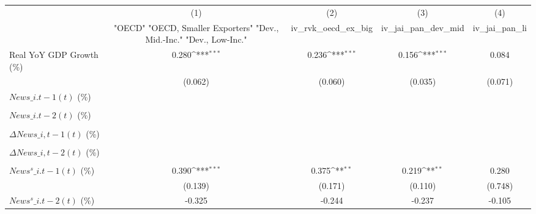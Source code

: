{
\def\sym#1{\ifmmode^{#1}\else\(^{#1}\)\fi}
\begin{tabular}{l*{4}{c}}
\toprule
                    &\multicolumn{1}{c}{(1)}&\multicolumn{1}{c}{(2)}&\multicolumn{1}{c}{(3)}&\multicolumn{1}{c}{(4)}\\
                    &\multicolumn{1}{c}{ "OECD" "OECD, Smaller Exporters" "Dev., Mid.-Inc." "Dev., Low-Inc."}&\multicolumn{1}{c}{iv\_rvk\_oecd\_ex\_big}&\multicolumn{1}{c}{iv\_jai\_pan\_dev\_mid}&\multicolumn{1}{c}{iv\_jai\_pan\_li}\\
\midrule
Real YoY GDP Growth (\%)&       0.280\sym{***}&       0.236\sym{***}&       0.156\sym{***}&       0.084         \\
                    &     (0.062)         &     (0.060)         &     (0.035)         &     (0.071)         \\
\addlinespace
$ News\_{i.t-1}(t)$ (\%)&                     &                     &                     &                     \\
                    &                     &                     &                     &                     \\
\addlinespace
$ News\_{i.t-2}(t)$ (\%)&                     &                     &                     &                     \\
                    &                     &                     &                     &                     \\
\addlinespace
$ \Delta News\_{i,t-1}(t)$ (\%)&                     &                     &                     &                     \\
                    &                     &                     &                     &                     \\
\addlinespace
$ \Delta News\_{i,t-2}(t)$ (\%)&                     &                     &                     &                     \\
                    &                     &                     &                     &                     \\
\addlinespace
$ News^s\_{i.t-1}(t)$ (\%)&       0.390\sym{***}&       0.375\sym{**} &       0.219\sym{**} &       0.280         \\
                    &     (0.139)         &     (0.171)         &     (0.110)         &     (0.748)         \\
\addlinespace
$ News^s\_{i.t-2}(t)$ (\%)&      -0.325         &      -0.244         &      -0.237         &      -0.105         \\

\end{tabular}}
